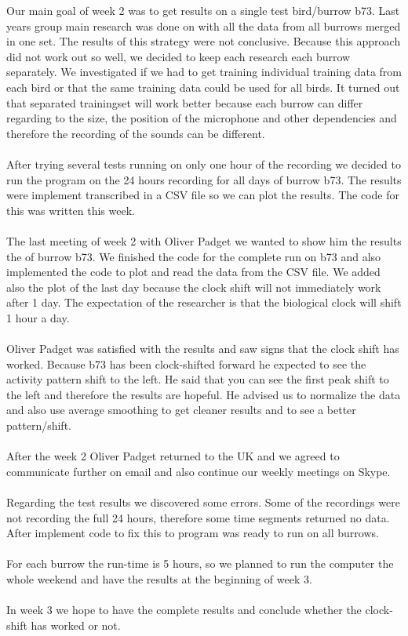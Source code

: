 \documentclass[a4paper]{article}
\begin{document}
Our main goal of week 2 was to get results on a single test bird/burrow b73. Last years group main research was done on with all the data from all burrows merged in one set. The results of this strategy were not conclusive. Because this approach did not work out so well, we decided to keep each research each burrow separately. We investigated if we had to get training individual training data from each bird or that the same training data could be used for all birds. It turned out that separated trainingset will work better because each burrow can differ regarding to the size, the position of the microphone and other dependencies and therefore the recording of the sounds can be different.\\\\
After trying several tests running on only one hour of the recording we decided to run the program on the 24 hours recording for all days of burrow b73. The results were implement transcribed in a CSV file so we can plot the results. The code for this was written this week. \\\\
The last meeting of week 2 with Oliver Padget we wanted to show him the results the of burrow b73. We finished the code for the complete run on b73 and also implemented the code to plot and read the data from the CSV file. 
We added also the plot of the last day because the clock shift will not immediately work after 1 day. The expectation of the researcher is that the biological clock will shift 1 hour a day. \\\\
Oliver Padget was satisfied with the results and saw signs that the clock shift has worked. Because b73 has been clock-shifted forward he expected to see the activity pattern shift to the left. He said that you can see the first peak shift to the left and therefore the results are hopeful. He advised us to normalize the data and also use average smoothing to get cleaner results and to see a better pattern/shift.\\\\
After the week 2 Oliver Padget returned to the UK and we agreed to communicate further on email and also continue our weekly meetings on Skype.\\\\
Regarding the test results we discovered some errors. Some of the recordings were not recording the full 24 hours, therefore some time segments returned no data. After implement code to fix this to program was ready to run on all burrows.\\\\
For each burrow the run-time is 5 hours, so we planned to run the computer the whole weekend and have the results at the beginning of week 3.\\\\
In week 3 we hope to have the complete results and conclude whether the clock-shift has worked or not. 
\end{document}
